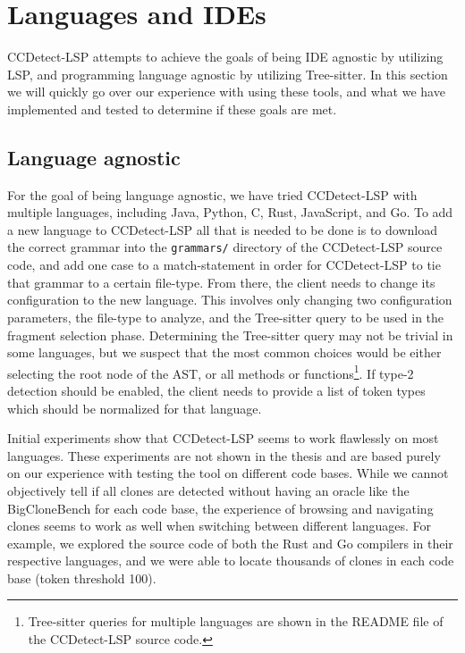 \section{Languages and IDEs}

CCDetect-LSP attempts to achieve the goals of being IDE agnostic by utilizing LSP, and
programming language agnostic by utilizing Tree-sitter. In this section we will quickly go
over our experience with using these tools, and what we have implemented and tested to
determine if these goals are met.

\subsection*{Language agnostic}

For the goal of being language agnostic, we have tried CCDetect-LSP with multiple
languages, including Java, Python, C, Rust, JavaScript, and Go. To add a new language to
CCDetect-LSP all that is needed to be done is to download the correct grammar into the
\verb|grammars/| directory of the CCDetect-LSP source code, and add one case to a
match-statement in order for CCDetect-LSP to tie that grammar to a certain file-type. From
there, the client needs to change its configuration to the new language. This involves
only changing two configuration parameters, the file-type to analyze, and the Tree-sitter
query to be used in the fragment selection phase. Determining the Tree-sitter query may
not be trivial in some languages, but we suspect that the most common choices would be
either selecting the root node of the AST, or all methods or
functions\footnote{Tree-sitter queries for multiple languages are shown in the README file
of the CCDetect-LSP source code.}. If type-2 detection should be enabled, the client needs
to provide a list of token types which should be normalized for that language.

Initial experiments show that CCDetect-LSP seems to work flawlessly on most languages.
These experiments are not shown in the thesis and are based purely on our experience with
testing the tool on different code bases. While we cannot objectively tell if all clones
are detected without having an oracle like the BigCloneBench for each code base, the
experience of browsing and navigating clones seems to work as well when switching between
different languages. For example, we explored the source code of both the Rust and Go
compilers in their respective languages, and we were able to locate thousands of clones in
each code base (token threshold 100).

